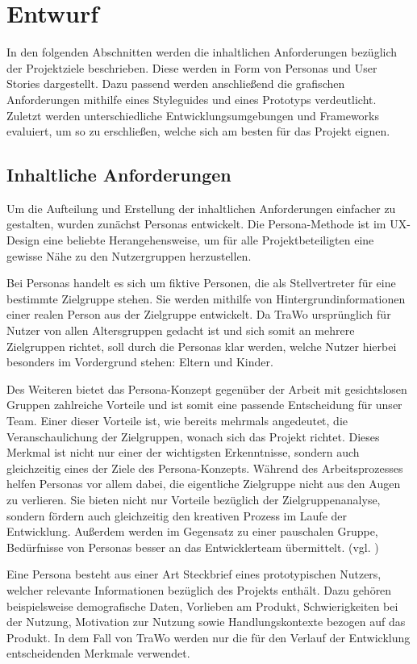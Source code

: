 \chapter{Entwurf}\label{ch:entwurf}
In den folgenden Abschnitten werden die inhaltlichen Anforderungen bezüglich der Projektziele beschrieben. Diese werden in Form von Personas und User Stories dargestellt. Dazu passend werden anschließend die grafischen Anforderungen mithilfe eines Styleguides und eines Prototyps verdeutlicht. Zuletzt werden unterschiedliche Entwicklungsumgebungen und Frameworks evaluiert, um so zu erschließen, welche sich am besten für das Projekt eignen.

\section{Inhaltliche Anforderungen}\label{inhaltliche_anforderungen}
Um die Aufteilung und Erstellung der inhaltlichen Anforderungen einfacher zu gestalten, wurden zunächst Personas entwickelt. Die Persona-Methode ist im UX-Design eine beliebte Herangehensweise, um für alle Projektbeteiligten eine gewisse Nähe zu den Nutzergruppen herzustellen.

Bei Personas handelt es sich um fiktive Personen, die als Stellvertreter für eine bestimmte Zielgruppe stehen. Sie werden mithilfe von Hintergrundinformationen einer realen Person aus der Zielgruppe entwickelt. Da TraWo ursprünglich für Nutzer von allen Altersgruppen gedacht ist und sich somit an mehrere Zielgruppen richtet, soll durch die Personas klar werden, welche Nutzer hierbei besonders im Vordergrund stehen: Eltern und Kinder.

Des Weiteren bietet das Persona-Konzept gegenüber der Arbeit mit gesichtslosen Gruppen zahlreiche Vorteile und ist somit eine passende Entscheidung für unser Team. Einer dieser Vorteile ist, wie bereits mehrmals angedeutet, die Veranschaulichung der Zielgruppen, wonach sich das Projekt richtet. Dieses Merkmal ist nicht nur einer der wichtigsten Erkenntnisse, sondern auch gleichzeitig eines der Ziele des Persona-Konzepts. Während des Arbeitsprozesses helfen Personas vor allem dabei, die eigentliche Zielgruppe nicht aus den Augen zu verlieren. Sie bieten nicht nur Vorteile bezüglich der Zielgruppenanalyse, sondern fördern auch gleichzeitig den kreativen Prozess im Laufe der Entwicklung. Außerdem werden im Gegensatz zu einer pauschalen Gruppe, Bedürfnisse von Personas besser an das Entwicklerteam übermittelt. (vgl. \cite{Personas})

Eine Persona besteht aus einer Art Steckbrief eines prototypischen Nutzers, welcher relevante Informationen bezüglich des Projekts enthält. Dazu gehören beispielsweise demografische Daten, Vorlieben am Produkt, Schwierigkeiten bei der Nutzung, Motivation zur Nutzung sowie Handlungskontexte bezogen auf das Produkt. In dem Fall von TraWo werden nur die für den Verlauf der Entwicklung entscheidenden Merkmale verwendet.

